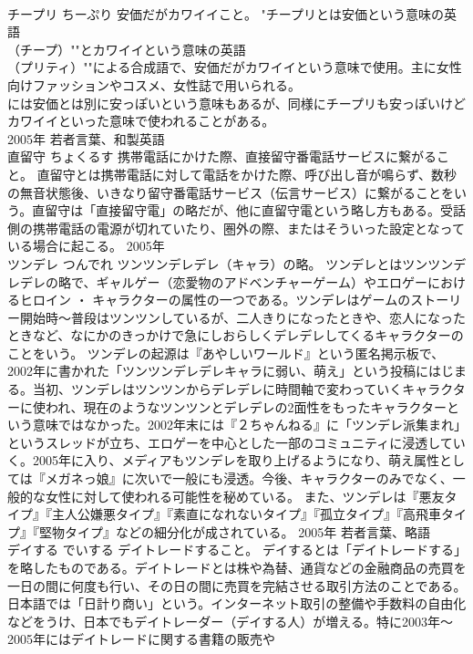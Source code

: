 \documentclass[8pt]{extreport}
\begin{document}
\begin{CJK}{UTF8}{min}
\\	チープリ	ちーぷり	安価だがカワイイこと。	"チープリとは安価という意味の英語
\\	（チープ）""とカワイイという意味の英語
\\	（プリティ）""による合成語で、安価だがカワイイという意味で使用。主に女性向けファッションやコスメ、女性誌で用いられる。
\\	には安価とは別に安っぽいという意味もあるが、同様にチープリも安っぽいけどカワイイといった意味で使われることがある。
\\	2005年	若者言葉、和製英語	
\\	直留守	ちょくるす	携帯電話にかけた際、直接留守番電話サービスに繋がること。	直留守とは携帯電話に対して電話をかけた際、呼び出し音が鳴らず、数秒の無音状態後、いきなり留守番電話サービス（伝言サービス）に繋がることをいう。直留守は「直接留守電」の略だが、他に直留守電という略し方もある。受話側の携帯電話の電源が切れていたり、圏外の際、またはそういった設定となっている場合に起こる。	2005年	
\\	ツンデレ	つんでれ	ツンツンデレデレ（キャラ）の略。	ツンデレとはツンツンデレデレの略で、ギャルゲー（恋愛物のアドベンチャーゲーム）やエロゲーにおけるヒロイン ・ キャラクターの属性の一つである。ツンデレはゲームのストーリー開始時～普段はツンツンしているが、二人きりになったときや、恋人になったときなど、なにかのきっかけで急にしおらしくデレデレしてくるキャラクターのことをいう。 ツンデレの起源は『あやしいワールド』という匿名掲示板で、2002年に書かれた「ツンツンデレデレキャラに弱い、萌え」という投稿にはじまる。当初、ツンデレはツンツンからデレデレに時間軸で変わっていくキャラクターに使われ、現在のようなツンツンとデレデレの2面性をもったキャラクターという意味ではなかった。2002年末には『２ちゃんねる』に「ツンデレ派集まれ」というスレッドが立ち、エロゲーを中心とした一部のコミュニティに浸透していく。2005年に入り、メディアもツンデレを取り上げるようになり、萌え属性としては『メガネっ娘』に次いで一般にも浸透。今後、キャラクターのみでなく、一般的な女性に対して使われる可能性を秘めている。 また、ツンデレは『悪友タイプ』『主人公嫌悪タイプ』『素直になれないタイプ』『孤立タイプ』『高飛車タイプ』『堅物タイプ』などの細分化が成されている。	2005年	若者言葉、略語	
\\	デイする	でいする	デイトレードすること。	デイするとは「デイトレードする」を略したものである。デイトレードとは株や為替、通貨などの金融商品の売買を一日の間に何度も行い、その日の間に売買を完結させる取引方法のことである。日本語では「日計り商い」という。インターネット取引の整備や手数料の自由化などをうけ、日本でもデイトレーダー（デイする人）が増える。特に2003年～2005年にはデイトレードに関する書籍の販売や

\end{CJK}
\end{document}
